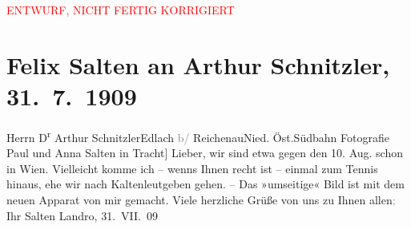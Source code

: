 
\begin{center}
            \textcolor{red}{ENTWURF, NICHT FERTIG KORRIGIERT}
                      \end{center}
            
         
         \renewcommand{\erwaehntePersonen}{Personen: Anna Katharina Rehmann, Paul Salten}
         \renewcommand{\erwaehnteInstitutionen}{Institutionen: Südbahnstrecke}
         \renewcommand{\erwaehnteOrte}{Orte: Edlach, Höhlenstein, Kaltenleutgeben, Niederösterreich, Wien}
         \renewcommand{\erwaehnteWerke}{}
               \section[Felix Salten an Arthur Schnitzler, 31. 7. 1909]{ Felix Salten an Arthur Schnitzler, 31. 7. 1909}\nopagebreak{}\rehead{ }\begin{ledgroupsized}[t]{13cm}\normalsize\beginnumbering \toendnotes[C]{\smallbreak\pagebreak[2]} 
\pstart{}{\pb}Herrn D\textsuperscript{r} Arthur Schnitzler\pend{}\pstart{}Edlach \textcolor{gray}{b/} Reichenau\pend{}\pstart{}Nied. Öst.Südbahn\pend{}{\bigskip}\pstart
           \noindent{}\centering{}{\pb}{[}Fotografie Paul und Anna Salten in
                     Tracht{]}\pend
           \pstart
           Lieber, wir sind etwa gegen den 10. Aug. schon in Wien. Vielleicht komme ich – wenns Ihnen recht ist – einmal zum
               Tennis hinaus, ehe wir nach Kaltenleutgeben
               gehen. – Das »umseitige« Bild ist mit dem neuen Apparat von mir gemacht. Viele
               herzliche Grüße von uns zu Ihnen allen\textcolor{gray}{;}\pend
           \pstart Ihr \spacefill\mbox{Salten}\pend{}\pstart
           Landro, 31. VII. 09\pend
           

\end{ledgroupsized}
